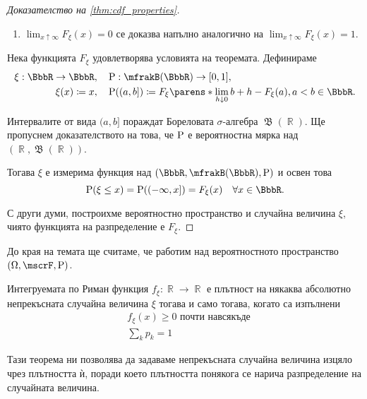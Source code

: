 \documentclass{../../common/topic}
\begin{document}
\begin{proof}[Доказателство на \cref{thm:cdf_properties}]
\begin{enumerate}
    \item \( \lim_{x \uparrow \infty} F_\xi(x) = 0 \) се доказва напълно аналогично на \( \lim_{x \uparrow \infty} F_\xi(x) = 1 \).
  \end{enumerate}

  \NecessitySubProof Нека функцията \( F_\xi \) удовлетворява условията на теоремата. Дефинираме
  \begin{align*}
    \xi: \BbbR \to \BbbR,     &&& \Prob: \mfrakB(\BbbR) \to [0, 1], \\
    \xi(x) \coloneqq x, &&& \Prob((a, b]) \coloneqq F_\xi \parens*{\lim_{h \downarrow 0} b + h } - F_\xi(a), a < b \in \BbbR.
  \end{align*}

  Интервалите от вида \( (a, b] \) пораждат Бореловата \( \sigma \)-алгебра \( \mfrakB(\BbbR) \). Ще пропуснем доказателството на това, че \( \operatorname{P} \) е вероятностна мярка над \( (\BbbR, \mfrakB(\BbbR)) \).

  Тогава \( \xi \) е измерима функция над \( (\BbbR, \mfrakB(\BbbR), \Prob) \) и освен това
  \begin{equation*}
    \Prob(\xi \leq x)
    =
    \Prob((-\infty, x])
    =
    F_\xi(x)\quad\forall x \in \BbbR.
  \end{equation*}

  С други думи, построихме вероятностно пространство и случайна величина \( \xi \), чиято функцията на разпределение е \( F_\xi \).
\end{proof}

До края на темата ще считаме, че работим над вероятностното пространство \( (\Omega, \mscrF, \Prob) \).

\begin{theorem}\label{thm:density_properties}
  Интегруемата по Риман функция \( f_\xi: \BbbR \to \BbbR \) е плътност на някаква абсолютно непрекъсната случайна величина \( \xi \) тогава и само тогава, когато са изпълнени
  \begin{align}
    &f_\xi(x) \geq 0 \text{ почти навсякъде} \tag{неотрицателност}\label{thm:density_properties/nonnegative} \\
    &\sum_k p_k = 1 \tag{нормираност}\label{thm:density_properties/normed}
  \end{align}
\end{theorem}

Тази теорема ни позволява да задаваме непрекъсната случайна величина изцяло чрез плътността ѝ, поради което плътността понякога се нарича разпределение на случайната величина.
\end{document}
